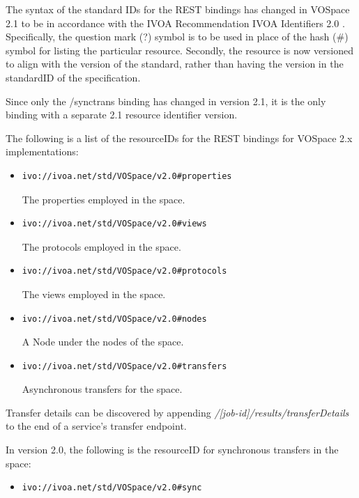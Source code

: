 \documentclass[11pt,a4paper]{ivoa}
\begin{document}
The syntax of the standard IDs for the REST bindings has changed in VOSpace 2.1 to be in accordance with the IVOA Recommendation IVOA Identifiers 2.0 \citep{2016ivoa.spec.0523D}.  Specifically, the question mark (?) symbol is to be used in place of the hash (\#) symbol for listing the particular resource.  Secondly, the resource is now versioned to align with the version of the standard, rather than having the version in the standardID of the specification.

Since only the /synctrans binding has changed in version 2.1, it is the only binding with a separate 2.1 resource identifier version.

The following is a list of the resourceIDs for the REST bindings for VOSpace 2.x implementations:

\begin{itemize}
    \item \begin{verbatim}ivo://ivoa.net/std/VOSpace/v2.0#properties\end{verbatim} The properties employed in the space.
    \item \begin{verbatim}ivo://ivoa.net/std/VOSpace/v2.0#views\end{verbatim} The protocols employed in the space.
    \item \begin{verbatim}ivo://ivoa.net/std/VOSpace/v2.0#protocols\end{verbatim} The views employed in the space.
    \item \begin{verbatim}ivo://ivoa.net/std/VOSpace/v2.0#nodes\end{verbatim} A Node under the nodes of the space.
    \item \begin{verbatim}ivo://ivoa.net/std/VOSpace/v2.0#transfers\end{verbatim} Asynchronous transfers for the space.
\end{itemize}

Transfer details can be discovered by appending \emph{/[job-id]/results/transferDetails} to the end of a service's transfer endpoint.

In version 2.0, the following is the resourceID for synchronous transfers in the space:

\begin{itemize}
    \item \begin{verbatim}ivo://ivoa.net/std/VOSpace/v2.0#sync\end{verbatim}
\end{itemize}
\end{document}
